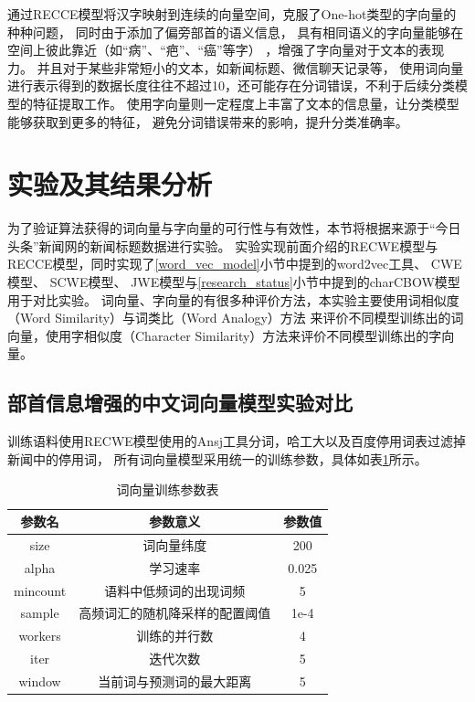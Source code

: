 通过RECCE模型将汉字映射到连续的向量空间，克服了One-hot类型的字向量的种种问题，
同时由于添加了偏旁部首的语义信息，
具有相同语义的字向量能够在空间上彼此靠近（如“病”、“疤”、“癌”等字）
，增强了字向量对于文本的表现力。
并且对于某些非常短小的文本，如新闻标题、微信聊天记录等，
使用词向量进行表示得到的数据长度往往不超过10，还可能存在分词错误，不利于后续分类模型的特征提取工作。
使用字向量则一定程度上丰富了文本的信息量，让分类模型能够获取到更多的特征，
避免分词错误带来的影响，提升分类准确率。

\section{实验及其结果分析}
为了验证算法获得的词向量与字向量的可行性与有效性，本节将根据来源于“今日头条”新闻网的新闻标题数据进行实验。
实验实现前面介绍的RECWE模型与RECCE模型，同时实现了\ref{word_vec_model}小节中提到的word2vec工具、
CWE模型、
SCWE模型、
JWE模型与\ref{research_status}小节中提到的charCBOW模型用于对比实验。
词向量、字向量的有很多种评价方法，本实验主要使用词相似度（Word Similarity）与词类比（Word Analogy）方法
来评价不同模型训练出的词向量，使用字相似度（Character Similarity）方法来评价不同模型训练出的字向量。
\subsection{部首信息增强的中文词向量模型实验对比}
训练语料使用RECWE模型使用的Ansj工具分词，哈工大以及百度停用词表过滤掉新闻中的停用词，
所有词向量模型采用统一的训练参数，具体如表\ref{word_vec_arg_form}所示。
\begin{table}[h]
    \caption{词向量训练参数表}
    \begin{tabular}{|c|c|c|}
        \hline
        参数名 & 参数意义 & 参数值 \\
        \hline
        size & 词向量纬度 & 200 \\
        \hline
        alpha & 学习速率 & 0.025 \\
        \hline
        mincount & 语料中低频词的出现词频 & 5 \\
        \hline
        sample & 高频词汇的随机降采样的配置阈值 & 1e-4 \\
        \hline
        workers & 训练的并行数 & 4 \\
        \hline
        iter & 迭代次数 & 5 \\
        \hline
        window & 当前词与预测词的最大距离 & 5 \\
        \hline
    \end{tabular}
    \label{word_vec_arg_form}
    \end{table}

